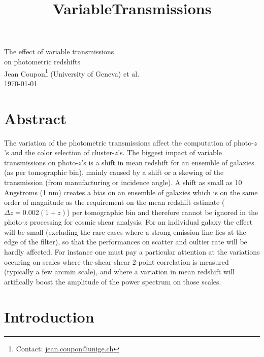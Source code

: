 \documentclass{article}
\title{VariableTransmissions}
\begin{document}
    
    
    

\begin{center}
\noindent
{\LARGE{{The effect of variable transmissions\\ on photometric redshifts}}}\\
Jean Coupon\footnote{Contact: \url{jean.coupon@unige.ch}} (University of Geneva) et al.\\
\today
\end{center}

    
    

    

    \hypertarget{abstract}{%
\section{Abstract}\label{abstract}}

The variation of the photometric transmissions affect the computation of
photo-\(z\)'s and the color selection of cluster-\(z\)'s. The biggest
impact of variable transmissions on photo-\(z\)'s is a shift in mean
redshift for an ensemble of galaxies (as per tomographic bin), mainly
caused by a shift or a skewing of the transmission (from manufacturing
or incidence angle). A shift as small as 10 Angstroms (1 nm) creates a
bias on an ensemble of galaxies which is on the same order of magnitude
as the requirement on the mean redshift estimate
(\(\Delta z = 0.002(1+z)\)) per tomographic bin and therefore cannot be
ignored in the photo-\(z\) processing for cosmic shear analysis. For an
individual galaxy the effect will be small (excluding the rare cases
where a strong emission line lies at the edge of the filter), so that
the performances on scatter and oultier rate will be hardly affected.
For instance one must pay a particular attention at the variations
occuring on scales where the shear-shear 2-point correlation is measured
(typically a few arcmin scale), and where a variation in mean redshift
will artifically boost the amplitude of the power spectrum on those
scales.

\hypertarget{introduction}{%
\section{Introduction}\label{introduction}}
\end{document}
